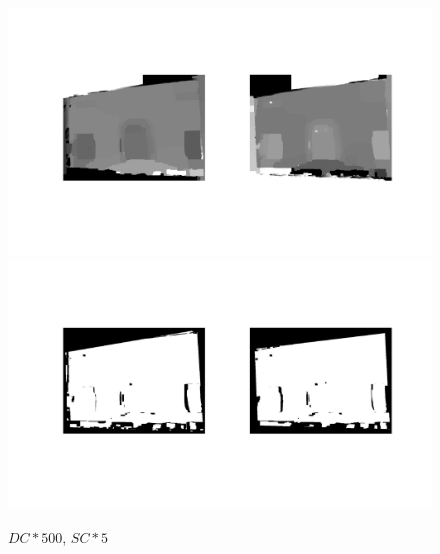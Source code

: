 \documentclass[12pt]{article}
\begin{document}
\begin{figure}[H]
	\centering
	\includegraphics[width=1.1\textwidth]{gc_500_5_1.jpg}
	\includegraphics[width=1.1\textwidth]{gc_500_5_2.jpg}
	\caption{$DC*500$, $SC*5$}
	\label{fig1}
\end{figure}
\vspace{5mm}
\end{document}
